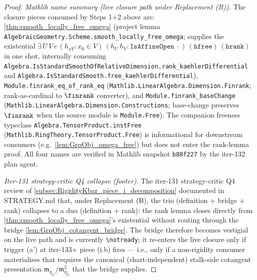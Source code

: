 \begin{proof}
  \emph{Mathlib name summary (live closure path under Replacement (B)).} The closure pieces consumed by Steps 1+2 above are: \cref{thm:smooth_locally_free_omega} (project lemma \texttt{AlgebraicGeometry.Scheme.smooth\_locally\_free\_omega}; supplies the existential \(\exists\,U\,V\,e\,(h_{xV} : x_0 \in V)\,(h_U\,h_V : \texttt{IsAffineOpen}\;\cdot)\,(\texttt{hfree})\,(\texttt{hrank})\) in one shot, internally consuming \texttt{Algebra.IsStandardSmoothOfRelativeDimension.rank\_kaehlerDifferential} and \texttt{Algebra.IsStandardSmooth.free\_kaehlerDifferential}), \texttt{Module.finrank\_eq\_of\_rank\_eq} (\texttt{Mathlib.LinearAlgebra.Dimension.Finrank}; rank-as-cardinal to \(\finrank\) converter), and \texttt{Module.finrank\_baseChange} (\texttt{Mathlib.LinearAlgebra.Dimension.Constructions}; base-change preserves \(\finrank\) when the source module is \texttt{Module.Free}). The companion freeness typeclass \texttt{Algebra.TensorProduct.instFree} (\texttt{Mathlib.RingTheory.TensorProduct.Free}) is informational for downstream consumers (e.g.\ \cref{lem:GrpObj_omega_free}) but does not enter the rank-lemma proof. All four names are verified in Mathlib snapshot \texttt{b80f227} by the iter-132 plan agent.

  \emph{Iter-131 strategy-critic Q4 collapse (footer).} The iter-131 strategy-critic Q4 review of \cref{subsec:RigidityKbar_piece_i_decomposition} documented in STRATEGY.md that, under Replacement (B), the trio (definition + bridge + rank) collapses to a duo (definition + rank): the rank lemma closes directly from \cref{thm:smooth_locally_free_omega}'s existential without routing through the bridge \cref{lem:GrpObj_cotangent_bridge}. The bridge therefore becomes vestigial on the live path and is currently \texttt{\textbackslash notready}; it re-enters the live closure only if trigger (a') at iter-133+ piece (i.b) fires — i.e., only if a non-rigidity consumer materialises that requires the canonical (chart-independent) stalk-side cotangent presentation \(\mathfrak m_{\eta_G}/\mathfrak m_{\eta_G}^{2}\) that the bridge supplies.
\end{proof}

